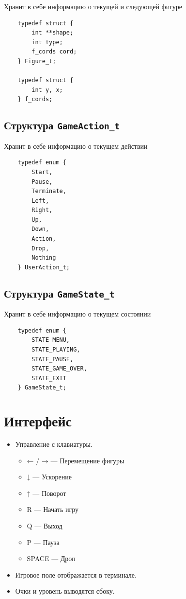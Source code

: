 \documentclass[a4paper, 12pt]{report}
\begin{document}
Хранит в себе информацию о текущей и следующей фигуре
\begin{verbatim}
    typedef struct {
        int **shape;
        int type;
        f_cords cord;
    } Figure_t;

    typedef struct {
        int y, x;
    } f_cords;
\end{verbatim}

\section{Структура \texttt{GameAction\_t}}

Хранит в себе информацию о текущем действии
\begin{verbatim}
    typedef enum {
        Start,
        Pause,
        Terminate,
        Left,
        Right,
        Up,
        Down,
        Action,
        Drop,
        Nothing
    } UserAction_t;
\end{verbatim}

\section{Структура \texttt{GameState\_t}}

Хранит в себе информацию о текущем состоянии
\begin{verbatim}
    typedef enum {
        STATE_MENU,
        STATE_PLAYING,
        STATE_PAUSE,
        STATE_GAME_OVER,
        STATE_EXIT
    } GameState_t;
\end{verbatim}

\clearpage
\chapter{Интерфейс}

\begin{itemize}
    \item Управление с клавиатуры.
    \begin{itemize}
        \item ← / → — Перемещение фигуры
        \item ↓     — Ускорение
        \item ↑     — Поворот
        \item R     — Начать игру
        \item Q     — Выход
        \item P     — Пауза
        \item SPACE — Дроп
    \end{itemize}
    \item Игровое поле отображается в терминале.
    \item Очки и уровень выводятся сбоку.
\end{itemize}
\end{document}
